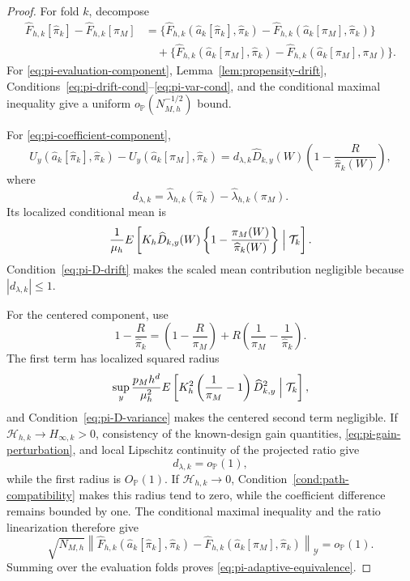 \begin{proof}
For fold \(k\), decompose
\begin{align}
\widehat F_{h,k}[\widehat\pi_k]-\widehat F_{h,k}[\pi_M]
&=
\{\widehat F_{h,k}(\widehat a_k[\widehat\pi_k],\widehat\pi_k)
  -\widehat F_{h,k}(\widehat a_k[\pi_M],\widehat\pi_k)\}
\label{eq:pi-coefficient-component}\\
&\quad+
\{\widehat F_{h,k}(\widehat a_k[\pi_M],\widehat\pi_k)
  -\widehat F_{h,k}(\widehat a_k[\pi_M],\pi_M)\}.
\label{eq:pi-evaluation-component}
\end{align}
For \eqref{eq:pi-evaluation-component}, Lemma~\ref{lem:propensity-drift}, Conditions~\eqref{eq:pi-drift-cond}--\eqref{eq:pi-var-cond}, and the conditional maximal inequality give a uniform \(o_{\mathbb P}(N_{M,h}^{-1/2})\) bound.

For \eqref{eq:pi-coefficient-component},
\begin{equation}
U_y(\widehat a_k[\widehat\pi_k],\widehat\pi_k)
-
U_y(\widehat a_k[\pi_M],\widehat\pi_k)
=
d_{\lambda,k}
\widehat D_{k,y}(W)
\left(1-\frac R{\widehat\pi_k(W)}\right),
\label{eq:pi-coefficient-signal}
\end{equation}
where
\[
d_{\lambda,k}
=
\widehat\lambda_{h,k}(\widehat\pi_k)
-
\widehat\lambda_{h,k}(\pi_M).
\]
Its localized conditional mean is
\begin{equation}
\frac1{\mu_h}
E\left[
K_h\widehat D_{k,y}(W)
\left\{1-\frac{\pi_M(W)}{\widehat\pi_k(W)}\right\}
\Bigm|\mathcal T_k
\right].
\label{eq:pi-coefficient-drift}
\end{equation}
Condition~\eqref{eq:pi-D-drift} makes the scaled mean contribution negligible because \(|d_{\lambda,k}|\le1\).

For the centered component, use
\[
1-\frac R{\widehat\pi_k}
=
\left(1-\frac R{\pi_M}\right)
+
R\left(\frac1{\pi_M}-\frac1{\widehat\pi_k}\right).
\]
The first term has localized squared radius
\[
\sup_y
\frac{p_Mh^d}{\mu_h^2}
E\left[
K_h^2
\left(\frac1{\pi_M}-1\right)
\widehat D_{k,y}^2
\Bigm|\mathcal T_k
\right],
\]
and Condition~\eqref{eq:pi-D-variance} makes the centered second term negligible. If \(\mathcal H_{h,k}\to H_{\infty,k}>0\), consistency of the known-design gain quantities, \eqref{eq:pi-gain-perturbation}, and local Lipschitz continuity of the projected ratio give
\[
d_{\lambda,k}=o_{\mathbb P}(1),
\]
while the first radius is \(O_{\mathbb P}(1)\). If \(\mathcal H_{h,k}\to0\), Condition~\ref{cond:path-compatibility} makes this radius tend to zero, while the coefficient difference remains bounded by one. The conditional maximal inequality and the ratio linearization therefore give
\[
\sqrt{N_{M,h}}
\left\|
\widehat F_{h,k}(\widehat a_k[\widehat\pi_k],\widehat\pi_k)
-
\widehat F_{h,k}(\widehat a_k[\pi_M],\widehat\pi_k)
\right\|_{\mathcal Y}
=o_{\mathbb P}(1).
\]
Summing over the evaluation folds proves \eqref{eq:pi-adaptive-equivalence}.


\end{proof}
